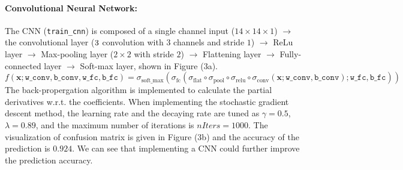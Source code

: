 \documentclass[11pt]{scrartcl}
\begin{document}
\begin{figure}[H]
	\captionsetup[subfigure]{labelformat=empty}
	\centering
	\label{fig:mlp}
\end{figure}


\paragraph{\textbf{Convolutional Neural Network:}}
The CNN (\texttt{train\_cnn}) is composed of a single channel input ($14\times 14\times1$) $\rightarrow$ the convolutional layer ($3\time3$ convolution with $3$ channels and stride $1$) $\rightarrow$ ReLu layer $\rightarrow$ Max-pooling layer ($2\times2$ with stride $2$) $\rightarrow$ Flattening layer $\rightarrow$ Fully-connected layer $\rightarrow$ Soft-max layer, shown in Figure (3a). 
$$
f(\mathbf{x};\texttt{w\_conv},\texttt{b\_conv},\texttt{w\_fc},\texttt{b\_fc})=\sigma_{\text{soft\_max}}(\sigma_{\text{fc}}(\sigma_{\text{flat}}\circ\sigma_{\text{pool}}\circ\sigma_{\text{relu}}\circ\sigma_{\text{conv}}(\mathbf{x};\texttt{w\_conv},\texttt{b\_conv});\texttt{w\_fc},\texttt{b\_fc}))
$$
The back-propergation algorithm is implemented to calculate the partial derivatives w.r.t. the coefficients. When implementing the stochastic gradient descent method, the learning rate and the decaying rate are tuned as $\gamma=0.5$, $\lambda=0.89$, and the maximum number of iterations is $\textit{nIters}=1000$. The visualization of confusion matrix is given in Figure (3b) and the accuracy of the prediction is $0.924$. We can see that implementing a CNN could further improve the prediction accuracy. 
\end{document}
